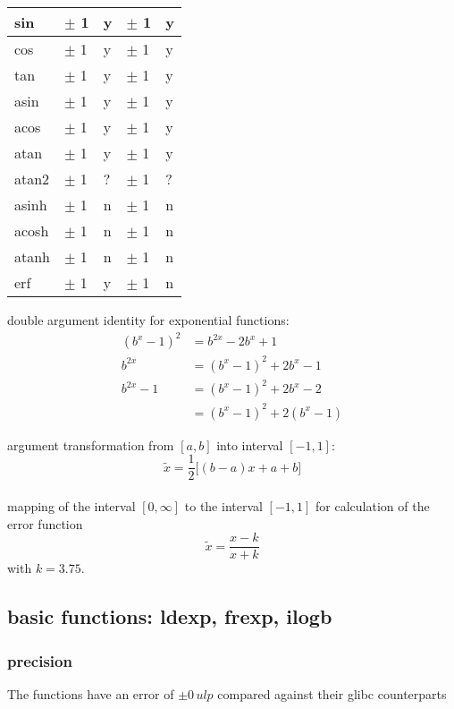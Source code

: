\documentclass[10pt,a4paper,wide]{article}
\numberwithin{equation}{subsection}
\begin{document}
\begin{tabular}{ | p{2.0cm} | p{2.0cm} | p{2.0cm} | p{2.0cm} | p{2.0cm} |}
    sin & $\pm$ 1 & y  & $\pm$ 1 & y \\
    \hline
    cos & $\pm$ 1 & y  & $\pm$ 1 & y \\
    \hline
    tan & $\pm$ 1 & y  & $\pm$ 1 & y \\
    \hline \hline
    asin & $\pm$ 1 & y  & $\pm$ 1 & y \\
    \hline
    acos & $\pm$ 1 & y  & $\pm$ 1 & y \\
    \hline
    atan & $\pm$ 1 & y  & $\pm$ 1 & y \\
    \hline
    atan2 & $\pm$ 1 & ?  & $\pm$ 1 & ? \\
    \hline \hline
    asinh & $\pm$ 1 & n  & $\pm$ 1 & n \\
    \hline
    acosh & $\pm$ 1 & n  & $\pm$ 1 & n \\
    \hline
    atanh & $\pm$ 1 & n  & $\pm$ 1 & n \\
    \hline \hline
    erf & $\pm$ 1 & y  & $\pm$ 1 & n \\
    \hline

\end{tabular}

double argument identity for exponential functions:
\[
    \begin{aligned}
        (b^x-1)^2 &= b^{2x} - 2b^x + 1 \\
        b^{2x}    &= (b^x-1)^2 + 2b^x - 1 \\
        b^{2x} -1 &= (b^x-1)^2 + 2b^x -2 \\
                  &= (b^x-1)^2 + 2(b^x-1)
    \end{aligned}
\]

argument transformation from $ [a, b] $ into interval $ [-1, 1] $:
\[
    \tilde x = \frac{1}{2} \big[(b-a) x + a +b \big]
\]
\\[10pt]
mapping of the interval $ [0, \infty] $ to the interval $ [-1, 1] $ for
calculation of the error function
\[
    \tilde x = \frac{x-k}{x+k}
\]
with $ k = 3.75 $.

\subsection{basic functions: ldexp, frexp, ilogb}
\label{sub_sec:base_math}
\subsubsection{precision}
The functions have an error of $ \pm 0\, ulp$ compared against their glibc
counterparts
\end{document}
